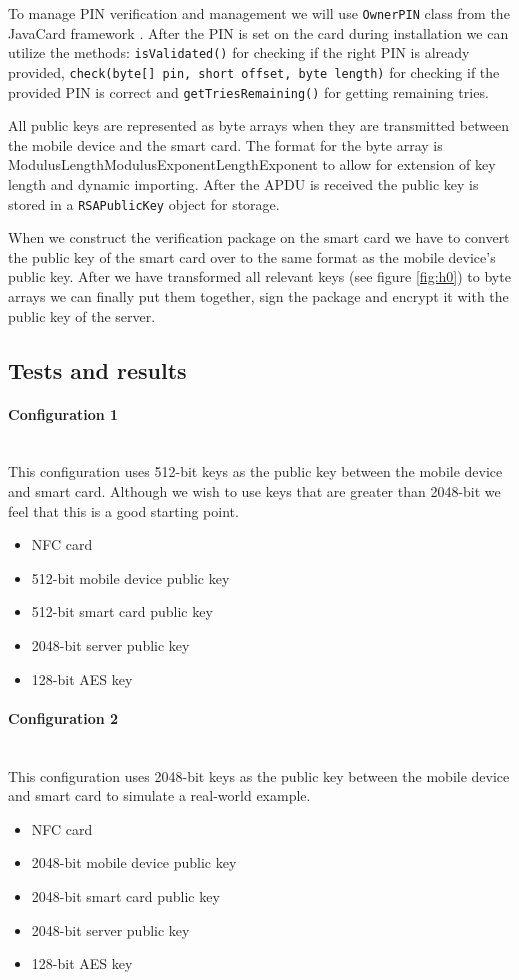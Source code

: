 To manage PIN verification and management we will use \texttt{OwnerPIN} class from the JavaCard framework \cite{ownerpin}. After the PIN is set on the card during installation we can utilize the methods: \texttt{isValidated()} for checking if the right PIN is already provided, \texttt{check(byte[] pin, short offset, byte length)} for checking if the provided PIN is correct and \texttt{getTriesRemaining()} for getting remaining tries.

All public keys are represented as byte arrays when they are transmitted between the mobile device and the smart card. The format for the byte array is \textbar{}ModulusLength\textbar{}Modulus\textbar{}ExponentLength\textbar{}Exponent\textbar{} to allow for extension of key length and dynamic importing. After the APDU is received the public key is stored in a \texttt{RSAPublicKey} object for storage.

When we construct the verification package on the smart card we have to convert the public key of the smart card over to the same format as the mobile device's public key. After we have transformed all relevant keys (see figure \ref{fig:h0}) to byte arrays we can finally put them together, sign the package and encrypt it with the public key of the server.

\subsection{Tests and results}
\paragraph{Configuration 1}\mbox{}\\
This configuration uses 512-bit keys as the public key between the mobile device and smart card. Although we wish to use keys that are greater than 2048-bit we feel that this is a good starting point.
\begin{itemize}
    \item NFC card
    \item 512-bit mobile device public key
    \item 512-bit smart card public key
    \item 2048-bit server public key
    \item 128-bit AES key
\end{itemize}

\paragraph{Configuration 2}\mbox{}\\
This configuration uses 2048-bit keys as the public key between the mobile device and smart card to simulate a real-world example.
\begin{itemize}
    \item NFC card
    \item 2048-bit mobile device public key
    \item 2048-bit smart card public key
    \item 2048-bit server public key
    \item 128-bit AES key
\end{itemize}

